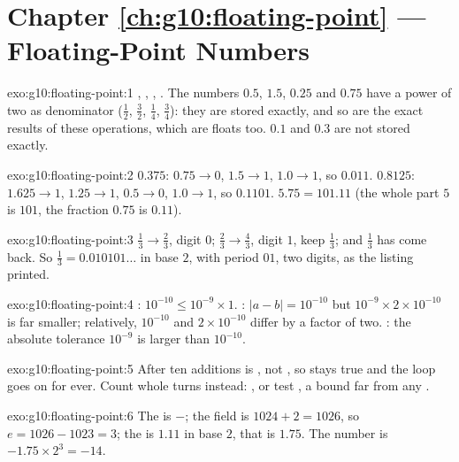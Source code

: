 \section*{Chapter \ref{ch:g10:floating-point} --- Floating-Point Numbers}

\begin{solution}{exo:g10:floating-point:1}
, , , . The numbers $0.5$, $1.5$, $0.25$ and $0.75$ have a
power of two as denominator ($\tfrac12$, $\tfrac32$, $\tfrac14$, $\tfrac34$): they are stored exactly, and so are the
exact results of these operations, which are floats too. $0.1$ and $0.3$ are not stored exactly.
\end{solution}

\begin{solution}{exo:g10:floating-point:2}
$0.375$: $0.75 \to 0$, $1.5 \to 1$, $1.0 \to 1$, so $0.011$. $0.8125$: $1.625 \to 1$, $1.25 \to 1$, $0.5 \to 0$,
$1.0 \to 1$, so $0.1101$. $5.75 = 101.11$ (the whole part $5$ is $101$, the fraction $0.75$ is $0.11$).
\end{solution}

\begin{solution}{exo:g10:floating-point:3}
$\tfrac13 \to \tfrac23$, digit $0$; $\tfrac23 \to \tfrac43$, digit $1$, keep $\tfrac13$; and $\tfrac13$ has come
back. So $\tfrac13 = 0.010101\dots$ in base $2$, with period $01$, two digits, as the listing printed.
\end{solution}

\begin{solution}{exo:g10:floating-point:4}
: $10^{-10} \le 10^{-9} \times 1$. : $|a - b| = 10^{-10}$ but $10^{-9} \times 2 \times 10^{-10}$
is far smaller; relatively, $10^{-10}$ and $2 \times 10^{-10}$ differ by a factor of two. : the absolute
tolerance $10^{-9}$ is larger than $10^{-10}$.
\end{solution}

\begin{solution}{exo:g10:floating-point:5}
After ten additions  is , not , so  stays true and the
loop goes on for ever. Count whole turns instead: , or test
, a bound far from any .
\end{solution}

\begin{solution}{exo:g10:floating-point:6}
The  is $-$; the  field is $1024 + 2 = 1026$, so $e = 1026 - 1023 = 3$; the  is
$1.11$ in base $2$, that is $1.75$. The number is $-1.75 \times 2^3 = -14$.
\end{solution}


